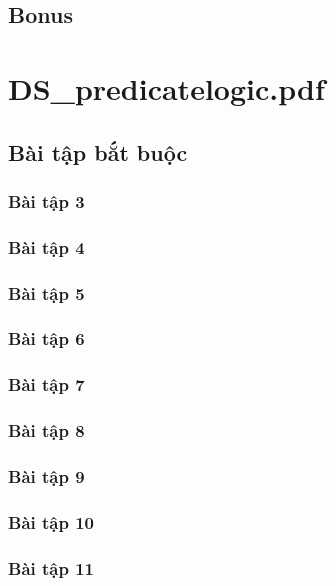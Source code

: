\documentclass[a4paper]{article}
\begin{document}
\clearpage
\subsection{Bonus}

\clearpage

\section{DS\_predicatelogic.pdf}
\subsection{Bài tập bắt buộc}
\subsubsection{Bài tập 3}

\clearpage
\subsubsection{Bài tập 4}

\clearpage
\subsubsection{Bài tập 5}

\clearpage
\subsubsection{Bài tập 6}

\clearpage
\subsubsection{Bài tập 7}

\clearpage
\subsubsection{Bài tập 8}

\clearpage
\subsubsection{Bài tập 9}

\clearpage
\subsubsection{Bài tập 10}

\clearpage
\subsubsection{Bài tập 11}
\end{document}
